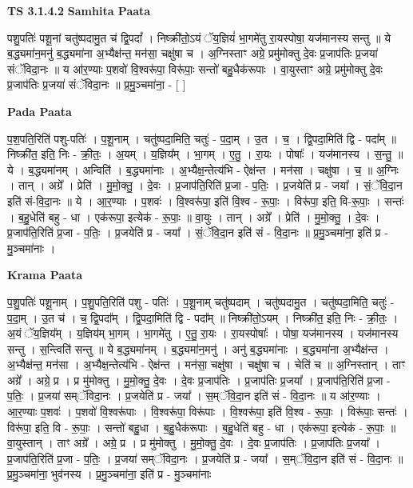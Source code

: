 \documentclass[17pt]{extarticle}
\begin{document}
\textbf{TS 3.1.4.2 } \newline
\textbf{Samhita Paata} \newline

पशु॒पतिः॑ पशू॒नां चतु॑ष्पदामु॒त च॑ द्वि॒पदां᳚ । निष्क्री॑तो॒ऽयं ॅय॒ज्ञियं॑ भा॒गमे॑तु रा॒यस्पोषा॒ यज॑मानस्य सन्तु ॥ ये ब॒द्ध्यमा॑न॒मनु॑ ब॒द्ध्यमा॑ना अ॒भ्यैक्ष॑न्त॒ मन॑सा॒ चक्षु॑षा च । अ॒ग्निस्ताꣳ अग्रे॒ प्रमु॑मोक्तु दे॒वः प्र॒जाप॑तिः प्र॒जया॑ संॅविदा॒नः ॥ य आ॑र॒ण्याः प॒शवो॑ वि॒श्वरू॑पा॒ विरू॑पाः॒ सन्तो॑ बहु॒धैक॑रूपाः । वा॒युस्ताꣳ अग्रे॒ प्रमु॑मोक्तु दे॒वः प्र॒जाप॑तिः प्र॒जया॑ संॅविदा॒नः ॥ प्र॒मु॒ञ्चमा॑ना॒ - [  ] \newline

\textbf{Pada Paata} \newline

प॒श॒पति॒रिति॑ पशु-पतिः॑ । प॒शू॒नाम् । चतु॑ष्पदा॒मिति॒ चतुः॑ - प॒दा॒म् । उ॒त । च॒ । द्वि॒पदा॒मिति॑ द्वि - पदा᳚म् ॥ निष्क्री॑त॒ इति॒ निः - क्री॒तः॒ । अ॒यम् । य॒ज्ञिय᳚म् । भा॒गम् । ए॒तु॒ । रा॒यः । पोषाः᳚ । यज॑मानस्य । स॒न्तु॒ ॥ ये । ब॒द्ध्यमा॑नम् । अन्विति॑ । ब॒द्ध्यमा॑नाः । अ॒भ्यैक्ष॒न्तेत्य॑भि - ऐक्ष॑न्त । मन॑सा । चक्षु॑षा । च॒ ॥ अ॒ग्निः । तान् । अग्रे᳚ । प्रेति॑ । मु॒मो॒क्तु॒ । दे॒वः । प्र॒जाप॑ति॒रिति॑ प्र॒जा - प॒तिः॒ । प्र॒जयेति॑ प्र - जया᳚ । सं॒ॅवि॒दा॒न इति॑ सं-वि॒दा॒नः ॥ ये । आ॒र॒ण्याः । प॒शवः॑ । वि॒श्वरू॑पा॒ इति॑ वि॒श्व - रू॒पाः॒ । विरू॑पा॒ इति॒ वि-रू॒पाः॒ । सन्तः॑ । ब॒हु॒धेति॑ बहु - धा । एक॑रूपा॒ इत्येक॑ - रू॒पाः॒ ॥ वा॒युः । तान् । अग्रे᳚ । प्रेति॑ । मु॒मो॒क्तु॒ । दे॒वः । प्र॒जाप॑ति॒रिति॑ प्र॒जा - प॒तिः॒ । प्र॒जयेति॑ प्र - जया᳚ । सं॒ॅवि॒दा॒न इति॑ सं - वि॒दा॒नः ॥ प्र॒मु॒ञ्चमा॑ना॒ इति॑ प्र - मु॒ञ्चमा॑नाः ।  \newline


\textbf{Krama Paata} \newline

प॒शु॒पतिः॑ पशू॒नाम् । प॒शु॒पति॒रिति॑ पशु - पतिः॑ । प॒शू॒नाम् चतु॑ष्पदाम् । चतु॑ष्पदामु॒त । चतु॑ष्पदा॒मिति॒ चतुः॑ - प॒दा॒म् । उ॒त च॑ । च॒ द्वि॒पदा᳚म् । द्वि॒पदा॒मिति॑ द्वि - पदा᳚म् ॥ निष्क्री॑तो॒ऽयम् । निष्क्री॑त॒ इति॒ निः - क्री॒तः॒ । अ॒यं ॅय॒ज्ञिय᳚म् । य॒ज्ञिय॑म् भा॒गम् । भा॒गमे॑तु । ए॒तु॒ रा॒यः । रा॒यस्पोषाः᳚ । पोषा॒ यज॑मानस्य । यज॑मानस्य सन्तु । स॒न्त्विति॑ सन्तु ॥ ये ब॒द्ध्यमा॑नम् । ब॒द्ध्यमा॑न॒मनु॑ । अनु॑ ब॒द्ध्यमा॑नाः । ब॒द्ध्यमा॑ना अ॒भ्यैक्ष॑न्त । अ॒भ्यैक्ष॑न्त॒ मन॑सा । अ॒भ्यैक्ष॒न्तेत्य॑भि - ऐक्ष॑न्त । मन॑सा॒ चक्षु॑षा । चक्षु॑षा च । चेति॑ च ॥ अ॒ग्निस्तान् । ताꣳ अग्रे᳚ । अग्रे॒ प्र । प्र मु॑मोक्तु । मु॒मो॒क्तु॒ दे॒वः । दे॒वः प्र॒जाप॑तिः । प्र॒जाप॑तिः प्र॒जया᳚ । प्र॒जाप॑ति॒रिति॑ प्र॒जा - प॒तिः॒ । प्र॒जया॑ सम्ॅविदा॒नः । प्र॒जयेति॑ प्र - जया᳚ । स॒म्ॅवि॒दा॒न इति॑ सं - वि॒दा॒नः ॥ य आ॑र॒ण्याः । आ॒र॒ण्याः प॒शवः॑ । प॒शवो॑ वि॒श्वरू॑पाः । वि॒श्वरू॑पा॒ विरू॑पाः । वि॒श्वरू॑पा॒ इति॑ वि॒श्व - रू॒पाः॒ । विरू॑पाः॒ सन्तः॑ । विरू॑पा॒ इति॒ वि - रू॒पाः॒ । सन्तो॑ बहु॒धा । ब॒हु॒धैक॑रूपाः । ब॒हु॒धेति॑ बहु - धा । एक॑रूपा॒ इत्येक॑ - रू॒पाः॒ ॥ वा॒युस्तान् । ताꣳ अग्रे᳚ । अग्रे॒ प्र । प्र मु॑मोक्तु । मु॒मो॒क्तु॒ दे॒वः । दे॒वः प्र॒जाप॑तिः । प्र॒जाप॑तिः प्र॒जया᳚ । प्र॒जाप॑ति॒रिति॑ प्र॒जा - प॒तिः॒ । प्र॒जया॑ सम्ॅविदा॒नः । प्र॒जयेति॑ प्र - जया᳚ । स॒म्ॅवि॒दा॒न इति॑ सं - वि॒दा॒नः ॥ प्र॒मु॒ञ्चमा॑ना॒ भुव॑नस्य । प्र॒मु॒ञ्चमा॑ना॒ इति॑ प्र - मु॒ञ्चमा॑नाः \newline
\end{document}

